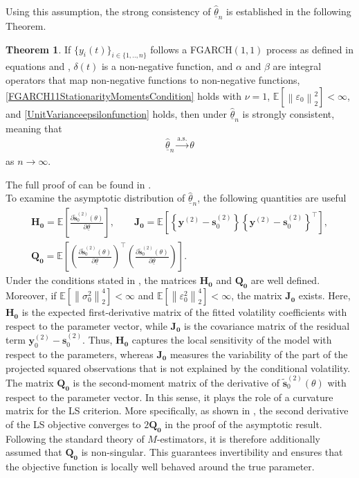 \documentclass[12pt,a4paper]{article}
\theoremstyle{definition}
\newtheorem{theorem}{Theorem}[section]
\begin{document}
Using this assumption, the strong consistency of $\underline{\hat{\theta}}_n$ is established in the following Theorem.
\begin{theorem}
\label{StrongConstistencyFGARCH11}
    If $\{y_i(t)\}_{i\in\{1,..,n\}}$ follows a FGARCH$(1,1)$ process as defined in equations  and , $\delta(t)$ is a non-negative function, and $\alpha$ and $\beta$ are integral operators that map non-negative functions to non-negative functions, \cref{FGARCH11StationarityMomentsCondition} holds with $\nu=1$, $\mathbb{E}\left[\left\|\varepsilon_0\right\|_2^2\right]<\infty$, and \cref{UnitVarianceepsilonfunction} holds, then under  $\underline{\hat{\theta}}_n$ is strongly consistent, meaning that
    \begin{gather}
        \underline{\hat{\theta}}_n \xrightarrow{\mathrm{a.s.}} \theta
    \end{gather}
    as $n\rightarrow\infty$.
\end{theorem}
The full proof of  can be found in \citet{Aue2017}.\\
To examine the asymptotic distribution of $\underline{\hat{\theta}}_n$, the following quantities are useful
\begin{gather}
    \mathbf{H_0}=\mathbb{E}\left[\frac{\partial \tilde{\mathbf{s}}_0^{(2)}(\theta)}{\partial\underline{\theta}}\right], \quad \quad \mathbf{J_0}=\mathbb{E}\left[\left\{\mathbf{y}^{(2)}-\mathbf{s}_0^{(2)}\right\}\left\{\mathbf{y}^{(2)}-\mathbf{s}_0^{(2)}\right\}^\top\right],\\
    \mathbf{Q_0}=\mathbb{E}\left[\left(\frac{\partial \tilde{\mathbf{s}}_0^{(2)}(\theta)}{\partial\underline{\theta}}\right)^\top\left(\frac{\partial \tilde{\mathbf{s}}_0^{(2)}(\theta)}{\partial\underline{\theta}}\right)\right].
\end{gather}
Under the conditions stated in , the matrices $\mathbf{H_0}$ and $\mathbf{Q_0}$ are well defined. Moreover, if $\mathbb{E}[\left\|\sigma_0^2\right\|_2^4]<\infty$ and $\mathbb{E}[\left\|\varepsilon_0^2\right\|_2^4]<\infty$, the matrix $\mathbf{J_0}$ exists. Here, $\mathbf{ H_0}$ is the expected first-derivative matrix of the fitted volatility coefficients with respect to the parameter vector, while $\mathbf{J_0}$ is the covariance matrix of the residual term $\mathbf y_0^{(2)}-\mathbf s_0^{(2)}$. Thus, $\mathbf{H_0}$ captures the local sensitivity of the model with respect to the parameters, whereas $\mathbf{J_0}$ measures the variability of the part of the projected squared observations that is not explained by the conditional volatility. The matrix $\mathbf{Q_0}$ is the second-moment matrix of the derivative of $\tilde{\mathbf s}_0^{(2)}(\theta)$ with respect to the parameter vector. In this sense, it plays the role of a curvature matrix for the LS criterion. More specifically, as shown in , the second derivative of the LS objective converges to $2\mathbf{Q_0}$ in the proof of the asymptotic result. Following the standard theory of $M$-estimators, it is therefore additionally assumed that $\mathbf{Q_0}$ is non-singular. This guarantees invertibility and ensures that the objective function is locally well behaved around the true parameter.
\end{document}
